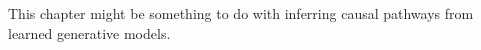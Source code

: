 \documentclass[../thesis.tex]{subfiles}
\begin{document}
This chapter might be something to do with inferring causal pathways from learned generative models.

\dobib %
\end{document}
